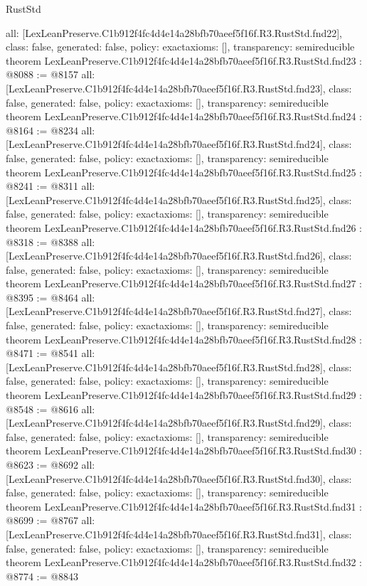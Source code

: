 \begin{lexlean}{RustStd}
\begin{coremodule}
{  all: [LexLeanPreserve.C1b912f4fc4d4e14a28bfb70aeef5f16f.R3.RustStd.fnd22],
  class: false,
  generated: false,
  policy: exact{axioms: []},
  transparency: semireducible
}
theorem LexLeanPreserve.C1b912f4fc4d4e14a28bfb70aeef5f16f.R3.RustStd.fnd23 : @8088 := @8157 {
  all: [LexLeanPreserve.C1b912f4fc4d4e14a28bfb70aeef5f16f.R3.RustStd.fnd23],
  class: false,
  generated: false,
  policy: exact{axioms: []},
  transparency: semireducible
}
theorem LexLeanPreserve.C1b912f4fc4d4e14a28bfb70aeef5f16f.R3.RustStd.fnd24 : @8164 := @8234 {
  all: [LexLeanPreserve.C1b912f4fc4d4e14a28bfb70aeef5f16f.R3.RustStd.fnd24],
  class: false,
  generated: false,
  policy: exact{axioms: []},
  transparency: semireducible
}
theorem LexLeanPreserve.C1b912f4fc4d4e14a28bfb70aeef5f16f.R3.RustStd.fnd25 : @8241 := @8311 {
  all: [LexLeanPreserve.C1b912f4fc4d4e14a28bfb70aeef5f16f.R3.RustStd.fnd25],
  class: false,
  generated: false,
  policy: exact{axioms: []},
  transparency: semireducible
}
theorem LexLeanPreserve.C1b912f4fc4d4e14a28bfb70aeef5f16f.R3.RustStd.fnd26 : @8318 := @8388 {
  all: [LexLeanPreserve.C1b912f4fc4d4e14a28bfb70aeef5f16f.R3.RustStd.fnd26],
  class: false,
  generated: false,
  policy: exact{axioms: []},
  transparency: semireducible
}
theorem LexLeanPreserve.C1b912f4fc4d4e14a28bfb70aeef5f16f.R3.RustStd.fnd27 : @8395 := @8464 {
  all: [LexLeanPreserve.C1b912f4fc4d4e14a28bfb70aeef5f16f.R3.RustStd.fnd27],
  class: false,
  generated: false,
  policy: exact{axioms: []},
  transparency: semireducible
}
theorem LexLeanPreserve.C1b912f4fc4d4e14a28bfb70aeef5f16f.R3.RustStd.fnd28 : @8471 := @8541 {
  all: [LexLeanPreserve.C1b912f4fc4d4e14a28bfb70aeef5f16f.R3.RustStd.fnd28],
  class: false,
  generated: false,
  policy: exact{axioms: []},
  transparency: semireducible
}
theorem LexLeanPreserve.C1b912f4fc4d4e14a28bfb70aeef5f16f.R3.RustStd.fnd29 : @8548 := @8616 {
  all: [LexLeanPreserve.C1b912f4fc4d4e14a28bfb70aeef5f16f.R3.RustStd.fnd29],
  class: false,
  generated: false,
  policy: exact{axioms: []},
  transparency: semireducible
}
theorem LexLeanPreserve.C1b912f4fc4d4e14a28bfb70aeef5f16f.R3.RustStd.fnd30 : @8623 := @8692 {
  all: [LexLeanPreserve.C1b912f4fc4d4e14a28bfb70aeef5f16f.R3.RustStd.fnd30],
  class: false,
  generated: false,
  policy: exact{axioms: []},
  transparency: semireducible
}
theorem LexLeanPreserve.C1b912f4fc4d4e14a28bfb70aeef5f16f.R3.RustStd.fnd31 : @8699 := @8767 {
  all: [LexLeanPreserve.C1b912f4fc4d4e14a28bfb70aeef5f16f.R3.RustStd.fnd31],
  class: false,
  generated: false,
  policy: exact{axioms: []},
  transparency: semireducible
}
theorem LexLeanPreserve.C1b912f4fc4d4e14a28bfb70aeef5f16f.R3.RustStd.fnd32 : @8774 := @8843 {
}
\end{coremodule}
\end{lexlean}
